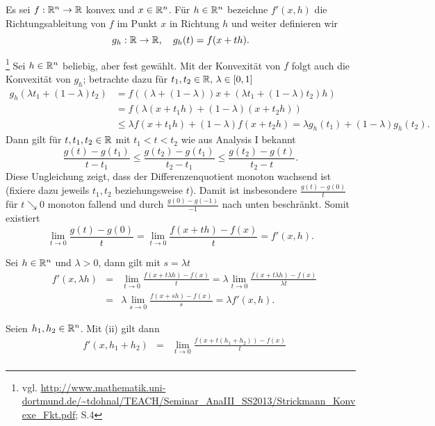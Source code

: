 Es sei $f:\mathbb{R}^n\to \mathbb{R}$ konvex und $x\in \mathbb{R}^n$. Für $h\in \mathbb{R}^n$ bezeichne $f'(x,h)$ die Richtungsableitung von $f$ im Punkt $x$ in Richtung $h$ und
weiter definieren wir 
\begin{displaymath}
 g_h:\mathbb{R}\to\mathbb{R},\quad g_h(t)=f(x+th).
\end{displaymath}

\begin{compactenum}[(i)]
 \item \footnote{vgl. \url{http://www.mathematik.uni-dortmund.de/~tdohnal/TEACH/Seminar\_AnaIII\_SS2013/Strickmann\_Konvexe\_Fkt.pdf}; S.4}
 Sei $h\in\mathbb{R}^n$ beliebig, aber fest gewählt. Mit der Konvexität von $f$ folgt auch die Konvexität von $g_h$;
 betrachte dazu für $t_1,t_2\in \mathbb{R}, \, \lambda\in[0,1]$
 \begin{align*}
  g_h(\lambda t_1+(1-\lambda)t_2)&= f((\lambda+(1-\lambda))x+(\lambda t_1+(1-\lambda)t_2)h)\\
  &=f(\lambda(x+t_1h)+(1-\lambda)(x+t_2h))\\
  &\leq \lambda f(x+t_1h)+(1-\lambda)f(x+t_2h)=\lambda g_h(t_1)+(1-\lambda)g_h(t_2).
 \end{align*}
 Dann gilt für $t,t_1,t_2\in \mathbb{R}$ mit $t_1<t<t_2$ wie aus Analysis I bekannt
 \begin{displaymath}
  \frac{g(t)-g(t_1)}{t-t_1}\leq\frac{g(t_2)-g(t_1)}{t_2-t_1}\leq\frac{g(t_2)-g(t)}{t_2-t}.
 \end{displaymath}
Diese Ungleichung zeigt, dass der Differenzenquotient monoton wachsend ist (fixiere dazu jeweils $t_1,t_2$ beziehungsweise $t$). Damit ist insbesondere $\frac{g(t)-g(0)}{t}$ für $t\searrow0$ monoton fallend und durch $\frac{g(0)-g(-1)}{-1}$ nach unten beschränkt.
 Somit existiert 
 \begin{displaymath}
  \lim_{t\to 0} \frac{g(t)-g(0)}{t}=\lim_{t\to 0}\frac{f(x+th)-f(x)}{t}=f'(x,h).
 \end{displaymath}
 \item Sei $h\in\mathbb{R}^n$ und $\lambda>0$, dann gilt mit $s=\lambda t$
 \begin{align*}
  &f'(x,\lambda h)&=&\lim_{t\to 0}\frac{f(x+t\lambda h)-f(x)}{t}=\lambda\lim_{t\to 0}\frac{f(x+t\lambda h)-f(x)}{\lambda t}\\
  &&=&\lambda\lim_{s\to 0}\frac{f(x+s h)-f(x)}{s}=\lambda f'(x,h).
 \end{align*}
 \item Seien $h_1, h_2\in\mathbb{R}^n$. Mit (ii) gilt dann
 \begin{align*}
  &f'(x,h_1+h_2)&=&\lim_{t\to 0} \frac{f(x+t(h_1+h_2))-f(x)}{t}\\

\end{align*}
\end{compactenum}
